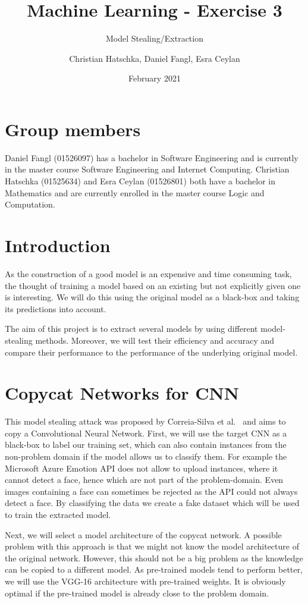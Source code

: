 \documentclass[a4paper,11pt]{article}
\title{Machine Learning - Exercise 3}
\subtitle{Model Stealing/Extraction}
\author{Christian Hatschka, Daniel Fangl, Esra Ceylan}
\date{February 2021}
\begin{document}
\maketitle

\section{Group members}
    Daniel Fangl (01526097) has a bachelor in Software Engineering and is currently in the master course Software Engineering and Internet Computing. Christian Hatschka (01525634) and Esra Ceylan (01526801) both have a bachelor in Mathematics and are currently enrolled in the master course Logic and Computation.
    
\section{Introduction}
    As the construction of a good model is an expensive and time consuming task, the thought of training a model based on an existing but not explicitly given one is interesting. We will do this using the original model as a black-box and taking its predictions into account.
    
    The aim of this project is to extract several models by using different model-stealing methods. Moreover, we will test their efficiency and accuracy and compare their performance to the performance of the underlying original model.
    
\section{Copycat Networks for CNN}\label{sec:copycat}
    This model stealing attack was proposed by Correia-Silva et al.~\cite{copycat} and aims to copy a Convolutional Neural Network. First, we will use the target CNN as a black-box to label our training set, which can also contain instances from the non-problem domain if the model allows us to classify them. For example the Microsoft Azure Emotion API does not allow to upload instances, where it cannot detect a face, hence which are not part of the problem-domain. Even images containing a face can sometimes be rejected as the API could not always detect a face. By classifying the data we create a fake dataset which will be used to train the extracted model.
    
    Next, we will select a model architecture of the copycat network. A possible problem with this approach is that we might not know the model architecture of the original network. However, this should not be a big problem as the knowledge can be copied to a different model.
    As pre-trained models tend to perform better, we will use the VGG-16 architecture with pre-trained weights. It is obviously optimal if the pre-trained model is already close to the problem domain.
    
\end{document}
